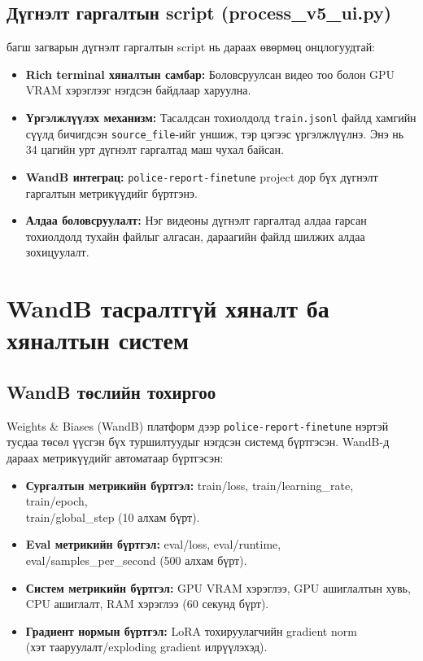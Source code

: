 \subsection{Дүгнэлт гаргалтын script (process\_v5\_ui.py)}

багш загварын дүгнэлт гаргалтын script нь дараах өвөрмөц онцлогуудтай:

\begin{itemize}
    \item \textbf{Rich terminal хяналтын самбар:} Боловсруулсан видео тоо болон GPU VRAM хэрэглээг нэгдсэн байдлаар харуулна.

    \item \textbf{Үргэлжлүүлэх механизм:} Тасалдсан тохиолдолд \texttt{train.jsonl} файлд хамгийн сүүлд бичигдсэн \texttt{source\_file}-ийг уншиж, тэр цэгээс үргэлжлүүлнэ. Энэ нь 34 цагийн урт дүгнэлт гаргалтад маш чухал байсан.

    \item \textbf{WandB интеграц:} \texttt{police-report-finetune} project дор бүх дүгнэлт гаргалтын метрикүүдийг бүртгэнэ.

    \item \textbf{Алдаа боловсруулалт:} Нэг видеоны дүгнэлт гаргалтад алдаа гарсан тохиолдолд тухайн файлыг алгасан, дараагийн файлд шилжих алдаа зохицуулалт.
\end{itemize}

\section{WandB тасралтгүй хяналт ба хяналтын систем}

\subsection{WandB төслийн тохиргоо}

Weights \& Biases (WandB) платформ дээр \texttt{police-report-finetune} нэртэй тусдаа төсөл үүсгэн бүх туршилтуудыг нэгдсэн системд бүртгэсэн. WandB-д дараах метрикүүдийг автоматаар бүртгэсэн:

\begin{itemize}
    \item \textbf{Сургалтын метрикийн бүртгэл:} train/loss, train/learning\_rate, train/epoch,\\ train/global\_step (10 алхам бүрт).
    \item \textbf{Eval метрикийн бүртгэл:} eval/loss, eval/runtime,\\ eval/samples\_per\_second (500 алхам бүрт).
    \item \textbf{Систем метрикийн бүртгэл:} GPU VRAM хэрэглээ, GPU ашиглалтын хувь,\\ CPU ашиглалт, RAM хэрэглээ (60 секунд бүрт).
    \item \textbf{Градиент нормын бүртгэл:} LoRA тохируулагчийн gradient norm\\ (хэт тааруулалт/exploding gradient илрүүлэхэд).
\end{itemize}

